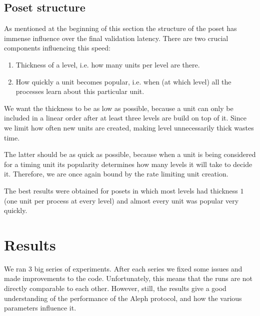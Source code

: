 \documentclass[a4paper,10pt]{article}
\begin{document}
		\subsection{Poset structure}
		 \label{ssec:posetShape}
			As mentioned at the beginning of this section the structure of the poset has immense influence over the final validation latency.
			There are two crucial components influencing this speed:
			\begin{enumerate}
				\item Thickness of a level, i.e. how many units per level are there.
				\item How quickly a unit becomes popular, i.e. when (at which level) all the processes learn about this particular unit.
			\end{enumerate}
			We want the thickness to be as low as possible, because a unit can only be included in a linear order after at least three levels are build on top of it.
			Since we limit how often new units are created, making level unnecessarily thick wastes time.

			The latter should be as quick as possible, because when a unit is being considered for a timing unit its popularity determines how many levels it will take to decide it.
		 Therefore, we are once again bound by the rate limiting unit creation.

			The best results were obtained for posets in which most levels had thickness $1$ (one unit per process at every level) and almost every unit was popular very quickly.
	\section{Results}
	 We ran 3 big series of experiments. After each series we fixed some issues and made improvements to the code.
	 	Unfortunately, this means that the runs are not directly comparable to each other.
	 	However, still, the results give a good understanding of the performance of the Aleph protocol, and how the various parameters influence it.
\end{document}
